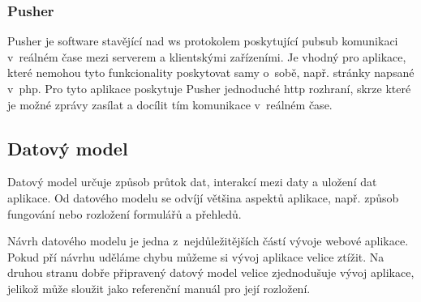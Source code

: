 \subsubsection{Pusher}
\label{subsub:pusher}

Pusher\cite{pusher} je software stavějící nad \acrshort{ws} protokolem poskytující \gls{pubsub} komunikaci v~reálném čase mezi serverem a klientskými zařízeními. Je vhodný pro aplikace, které nemohou tyto funkcionality poskytovat samy o~sobě, např. stránky napsané v~\acrshort{php}. Pro tyto aplikace poskytuje Pusher jednoduché \acrshort{http} rozhraní, skrze které je možné zprávy zasílat a docílit tím komunikace v~reálném čase.

\subsection{Datový model}

Datový model\cite{data-model} určuje způsob průtok dat, interakcí mezi daty a uložení dat aplikace. Od datového modelu se odvíjí většina aspektů aplikace, např. způsob fungování nebo rozložení formulářů a přehledů.

Návrh datového modelu je jedna z~nejdůležitějších částí vývoje webové aplikace.  Pokud pří návrhu uděláme chybu můžeme si vývoj aplikace velice ztížit. Na druhou stranu dobře připravený datový model velice zjednodušuje vývoj aplikace, jelikož může sloužit jako referenční manuál pro její rozložení.
